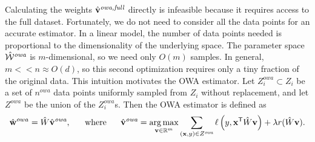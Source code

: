 \documentclass[thesis.tex]{subfiles}
\newcommand{\Zowa}{Z^{\textit{owa}}}
\newcommand{\nowa}{n^{\textit{owa}}}
\begin{document}
Calculating the weights $\hat{\mathbf{v}}^{\textit{owa,full}}$ directly is infeasible because it requires access to the full dataset.
Fortunately, we do not need to consider all the data points for an accurate estimator.
In a linear model, the number of data points needed is proportional to the dimensionality of the underlying space.
The parameter space ${\hat {{\mathcal W}}^{\textit{owa}}}$ is $m$-dimensional, so we need only $O(m)$ samples.
In general, $m <\!\!< n \approx O(d)$, so this second optimization requires only a tiny fraction of the original data.
This intuition motivates the OWA estimator.
Let $\Zowa_i\subset Z_i$ be a set of $\nowa$ data points uniformly sampled from $Z_i$ without replacement,
and let $\Zowa$ be the union of the $\Zowa_i$s.
Then the OWA estimator is defined as
\begin{equation}
\label{eq:wowa}
\wowa = \matW \vowa,
\text{~~~~~where~~~~~}
\vowa = \argmax_{\vv\in\mathbb R^m} \sum _{(\x,y)\in \Zowa} \loss\left(y,\trans\x \matW \vv \right)
+ \lambda \reg(\matW\vv)
.
\end{equation}

\end{document}
